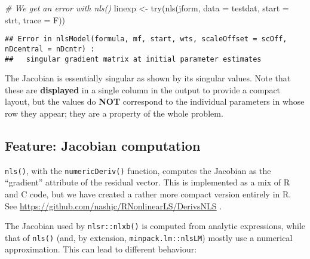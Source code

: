 \documentclass[
]{article}
\newenvironment{Shaded}{\begin{snugshade}}{\end{snugshade}}
\newcommand{\AttributeTok}[1]{\textcolor[rgb]{0.77,0.63,0.00}{#1}}
\newcommand{\CommentTok}[1]{\textcolor[rgb]{0.56,0.35,0.01}{\textit{#1}}}
\newcommand{\FunctionTok}[1]{\textcolor[rgb]{0.00,0.00,0.00}{#1}}
\newcommand{\NormalTok}[1]{#1}
\newcommand{\OtherTok}[1]{\textcolor[rgb]{0.56,0.35,0.01}{#1}}
\begin{document}
\begin{Shaded}
\begin{Highlighting}[]
\CommentTok{\# We get an error with nls()}
\NormalTok{linexp }\OtherTok{\textless{}{-}} \FunctionTok{try}\NormalTok{(}\FunctionTok{nls}\NormalTok{(jform, }\AttributeTok{data =}\NormalTok{ testdat, }\AttributeTok{start =}\NormalTok{ strt, }\AttributeTok{trace =}\NormalTok{ F))}
\end{Highlighting}
\end{Shaded}

\begin{verbatim}
## Error in nlsModel(formula, mf, start, wts, scaleOffset = scOff, nDcentral = nDcntr) : 
##   singular gradient matrix at initial parameter estimates
\end{verbatim}

The Jacobian is essentially singular as shown by its singular values.
Note that these are \textbf{displayed} in a single column in the output
to provide a compact layout, but the values do \textbf{NOT} correspond
to the individual parameters in whose row they appear; they are a
property of the whole problem.

\hypertarget{feature-jacobian-computation}{%
\subsection{Feature: Jacobian
computation}\label{feature-jacobian-computation}}

\texttt{nls()}, with the \texttt{numericDeriv()} function, computes the
Jacobian as the ``gradient'' attribute of the residual vector. This is
implemented as a mix of R and C code, but we have created a rather more
compact version entirely in R. See
\url{https://github.com/nashjc/RNonlinearLS/DerivsNLS} .

The Jacobian used by \texttt{nlsr::nlxb()} is computed from analytic
expressions, while that of \texttt{nls()} (and, by extension,
\texttt{minpack.lm::nlsLM}) mostly use a numerical approximation. This
can lead to different behaviour:
\end{document}

